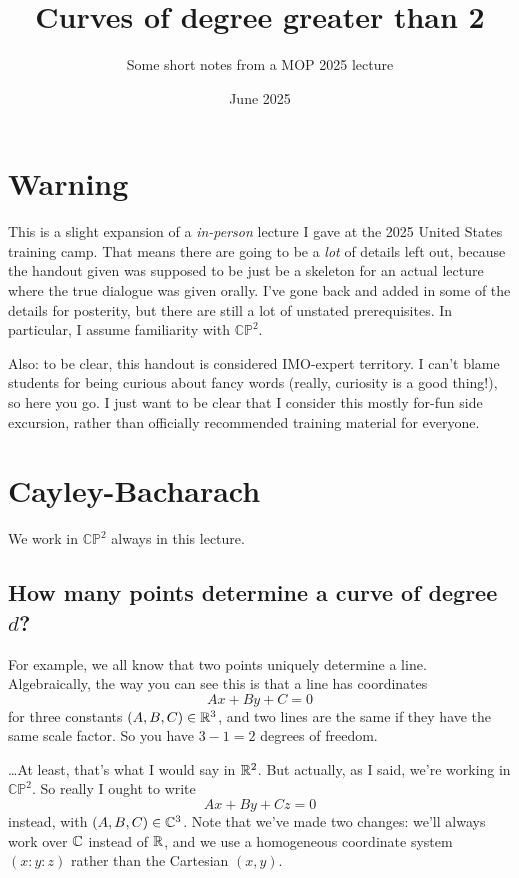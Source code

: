 \documentclass[11pt]{scrartcl}
\begin{document}
\title{Curves of degree greater than 2}
\subtitle{Some short notes from a MOP 2025 lecture}
\date{June 2025}
\maketitle

\setcounter{section}{-1}

\section{Warning}
This is a slight expansion of a \emph{in-person} lecture
I gave at the 2025 United States training camp.
That means there are going to be a \emph{lot} of details left out,
because the handout given was supposed to be just be a skeleton
for an actual lecture where the true dialogue was given orally.
I've gone back and added in some of the details for posterity,
but there are still a lot of unstated prerequisites.
In particular, I assume familiarity with $\mathbb{CP}^2$.

Also: to be clear, this handout is considered IMO-expert territory.
I can't blame students for being curious about fancy words
(really, curiosity is a good thing!), so here you go.
I just want to be clear that I consider this mostly for-fun side excursion,
rather than officially recommended training material for everyone.

\section{Cayley-Bacharach}
We work in $\mathbb{CP}^2$ always in this lecture.

\subsection{How many points determine a curve of degree $d$?}
For example, we all know that two points uniquely determine a line.
Algebraically, the way you can see this is that a line has coordinates
\[ Ax + By + C = 0 \]
for three constants $(A,B,C) \in \mathbb R^3$, and two lines are the same if they have the same scale factor.
So you have $3-1 = 2$ degrees of freedom.

\dots At least, that's what I would say in $\mathbb R^2$.
But actually, as I said, we're working in $\mathbb{CP}^2$.
So really I ought to write
\[ Ax + By + Cz = 0 \]
instead, with $(A,B,C) \in \mathbb C^3$.
Note that we've made two changes:
we'll always work over $\mathbb C$ instead of $\mathbb R$,
and we use a homogeneous coordinate system $(x:y:z)$ rather than the Cartesian $(x,y)$.
\end{document}
